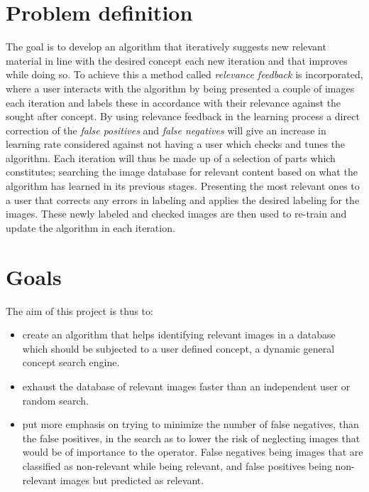 \section{Problem definition}
The goal is to develop an algorithm that iteratively suggests new relevant material in line with the desired concept each new iteration and that improves while doing so. To achieve this a method called \emph{relevance feedback} is incorporated, where a user interacts with the algorithm by being presented a couple of images each iteration and labels these in accordance with their relevance against the sought after concept. 
By using relevance feedback in the learning process a direct correction of the \emph{false positives} and \emph{false negatives} will give an increase in learning rate considered against not having a user which checks and tunes the algorithm. Each iteration will thus be made up of a selection of parts which constitutes; searching the image database for relevant content based on what the algorithm has learned in its previous stages. Presenting the most relevant ones to a user that corrects any errors in labeling and applies the desired labeling for the images. These newly labeled and checked images are then used to re-train and update the algorithm in each iteration.


\section{Goals}
\label{sec:intro:goals}
The aim of this project is thus to:
\begin{itemize} 
	\item create an algorithm that helps identifying relevant images in a database which should be subjected to a user defined concept, a dynamic general concept search engine. 
	\item exhaust the database of relevant images faster than an independent user or random search. 
	\item put more emphasis on trying to minimize the number of false negatives, than the false positives, in the search as to lower the risk of neglecting images that would be of importance to the operator. False negatives being images that are classified as non-relevant while being relevant, and false positives being non-relevant images but predicted as relevant. 
\end{itemize}

